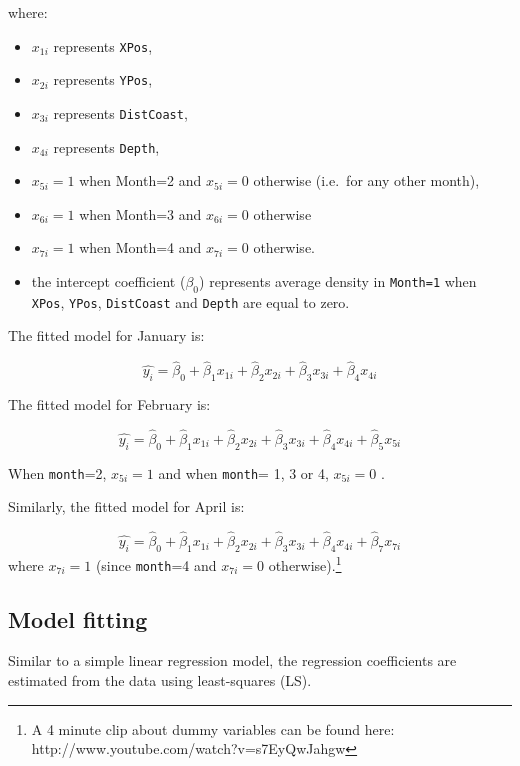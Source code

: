 \documentclass[
  oneside]{krantz}
\begin{document}
where:

\begin{itemize}
\item
  \(x_{1i}\) represents \texttt{XPos},
\item
  \(x_{2i}\) represents \texttt{YPos},\\
\item
  \(x_{3i}\) represents \texttt{DistCoast},
\item
  \(x_{4i}\) represents \texttt{Depth},\\
\item
  \(x_{5i}=1\) when Month=2 and \(x_{5i}=0\) otherwise (i.e.~for any other month),
\item
  \(x_{6i}=1\) when Month=3 and \(x_{6i}=0\) otherwise
\item
  \(x_{7i}=1\) when Month=4 and \(x_{7i}=0\) otherwise.
\item
  the intercept coefficient (\(\beta_0\)) represents average density in \texttt{Month=1} when \texttt{XPos}, \texttt{YPos}, \texttt{DistCoast} and \texttt{Depth} are equal to zero.
\end{itemize}

The fitted model for January is:

\[\hat{y_{i}}=\hat{\beta}_0+\hat{\beta}_1x_{1i}+\hat{\beta}_2x_{2i}+\hat{\beta}_3x_{3i}+\hat{\beta}_4x_{4i}\]

The fitted model for February is:

\[\hat{y_{i}}=\hat{\beta}_0+\hat{\beta}_1x_{1i}+\hat{\beta}_2x_{2i}+\hat{\beta}_3x_{3i}+\hat{\beta}_4x_{4i}+\hat{\beta}_{5}x_{5i}\]

When \texttt{month}=2, \(x_{5i}=1\) and when \texttt{month}= 1, 3 or 4, \(x_{5i}=0\) .

Similarly, the fitted model for April is:

\[\hat{y_{i}}=\hat{\beta}_0+\hat{\beta}_1x_{1i}+\hat{\beta}_2x_{2i}+\hat{\beta}_3x_{3i}+\hat{\beta}_4x_{4i}+\hat{\beta}_{7}x_{7i}\]
where \(x_{7i}=1\) (since \texttt{month}=4 and \(x_{7i}=0\) otherwise).\footnote{A 4 minute clip about dummy variables can be found here: http://www.youtube.com/watch?v=s7EyQwJahgw}

\hypertarget{model-fitting}{%
\subsection{Model fitting}\label{model-fitting}}

Similar to a simple linear regression model, the regression coefficients are estimated from the data using least-squares (LS).
\end{document}
